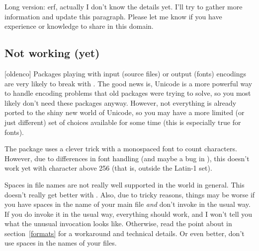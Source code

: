 \documentclass{lltxdoc}
\begin{document}
Long version: erf, actually I don't know the details yet. I'll try to gather
more information and update this paragraph. Please let me know if you have
experience or knowledge to share in this domain.

\subsection{Not working (yet)}\label{notworking}

[oldenco] Packages playing with input (source files) or
output (fonts) encodings are very likely to break with \luatex. The good news
is, Unicode is a more powerful way to handle encoding problems that old
packages were trying to solve, so you most likely don't need these packages
anyway. However, not everything is already ported to the shiny new world of
Unicode, so you may have a more limited (or just different) set of choices
available for some time (this is especially true for fonts).

 The  package uses a clever trick with a monospaced font
to count characters. However, due to differences in font handling (and maybe a
bug in \luatex), this doesn't work yet with character above 256 (that is,
outside the Latin-1 set).

 Spaces in file names are not really well supported in the \tex
world in general. This doesn't really get better with \luatex. Also, due to
tricky reasons, things may be worse if you have spaces in the name of your main
\tex file \emph{and} don't invoke \luatex in the usual way. If you do
invoke it in the usual way, everything should work, and I won't tell you what
the unusual invocation looks like. Otherwise, read the point about
 in section~\ref{formats} for a workaround and technical
details. Or even better, don't use spaces in the names of your \tex files.
\end{document}
